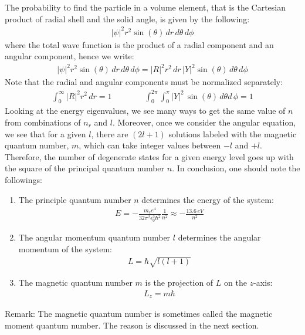 \documentclass[11pt]{article}
\theoremstyle{break}
\theoremstyle{break}
\newcommand{\remark}{\color{blue}Remark: \color{black}}
\begin{document}
The probability to find the particle in a volume element, that is the Cartesian product of radial shell and the solid angle, is given by the following:
\begin{align*}
|\psi|^2 r^2 \sin(\theta)\,dr\, d\theta\, d\phi
\end{align*}
where the total wave function is the product of a radial component and an angular component, hence we write:
\begin{align*}
|\psi|^2 r^2 \sin(\theta)\,dr\, d\theta\, d\phi = |R|^2r^2 \, dr \, |Y|^2\sin(\theta)\, d\theta\, d\phi
\end{align*}
Note that the radial and angular components must be normalized separately:
\begin{align*}
\int_0^\infty |R|^2 r^2 \, dr = 1 \qquad\qquad \int_0^{2\pi} \int_0^{\pi} |Y|^2\, \sin(\theta)\, d\theta d\,\phi= 1
\end{align*}
Looking at the energy eigenvalues, we see many ways to get the same value of $n$ from combinations of $n_r$ and $l$. Moreover, once we consider the angular equation, we see that for a given $l$, there are $(2l+1)$ solutions labeled with the magnetic quantum number, $m$, which can take integer values between $-l$ and $+l$.  Therefore, the number of degenerate states for a given energy level goes up with the square of the principal quantum number $n$. In conclusion, one should note the followings:
\begin{enumerate}
\item The principle quantum number $n$ determines the energy of the system:
\begin{align*}
E=-\frac{m_ee^4}{32\pi^2 \epsilon_0^2 \hbar^2}\frac{1}{n^2} \approx -\frac{13.6\, eV}{n^2}
\end{align*}
\item The angular momentum quantum number $l$ determines the angular momentum of the system: 
\begin{align*}
L = \hbar\sqrt{l(l+1)}
\end{align*}
\item The magnetic quantum number $m$ is the projection of $L$ on the $z$-axis:
\begin{align*}
L_z = m\hbar
\end{align*}
\end{enumerate}
\remark The magnetic quantum number is sometimes called the magnetic moment quantum number. The reason is discussed in the next section.
\end{document}
